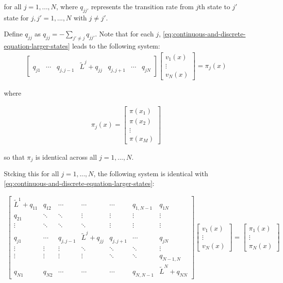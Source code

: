 \documentclass[11pt]{article}
\theoremstyle{definition}
\begin{document}
for all $j=1 ,...,N$, where $q_{jj'}$ represents the transition rate from $j$th state to $j'$ state for $j, j' = 1,...,N$ with $j \neq j'$.

Define $q_{jj}$ as $q_{jj} = -\sum_{j' \neq j} q_{jj'}$. Note that for each $j$, \eqref{eq:continuous-and-discrete-equation-larger-states} leads to the following system:
\begin{align}
\begin{bmatrix}
q_{j1} &  \cdots & q_{j,j-1} & \tilde{L}^j + q_{jj} & q_{j,j+1} & \cdots & q_{jN}
\end{bmatrix}
\begin{bmatrix}
v_1 (x) \\
\vdots \\
v_N (x)
\end{bmatrix}
=
\pi_j (x)
\end{align}

where 

\begin{align}
\pi_j (x) = 
\begin{bmatrix}
\pi (x_1) \\ \pi (x_2) \\ \vdots \\ \pi (x_M)
\end{bmatrix}
\end{align}

so that $\pi_j$ is identical across all $j = 1,...,N$.

Stcking this for all $j = 1,...,N$, the following system is identical with \eqref{eq:continuous-and-discrete-equation-larger-states}:

\begin{align}
\begin{bmatrix}
\tilde{L}^1 + q_{11} & q_{12} & \cdots &  \cdots & \cdots & q_{1,N-1} & q_{1N} \\ 
q_{21} & \ddots & \ddots & \vdots & \vdots & \vdots & \vdots  \\
\vdots & \ddots & \ddots & \ddots  & \vdots & \vdots & \vdots
\\
q_{j1} &  \cdots & q_{j,j-1} & \tilde{L}^j + q_{jj} & q_{j,j+1} & \cdots & q_{jN} \\
\vdots & \vdots& \vdots &  \ddots & \ddots & \ddots  & \vdots \\ 
\vdots & \vdots  & \vdots& \vdots &  \ddots & \ddots & q_{N-1,N} \\
q_{N1} & q_{N2} & \cdots &  \cdots & \cdots & q_{N,N-1} & \tilde{L}^N + q_{NN} 
\end{bmatrix}
\begin{bmatrix}
v_1 (x) \\
\vdots \\
v_N (x)
\end{bmatrix}
=
\begin{bmatrix}
\pi_1 (x) \\
\vdots \\
\pi_N (x)
\end{bmatrix}
\end{align}
\end{document}
